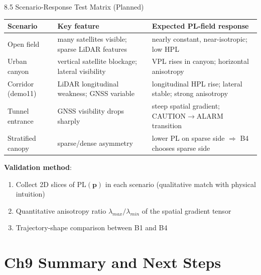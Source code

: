 \documentclass[10pt,aspectratio=169,xcolor=dvipsnames]{beamer}
\newcommand{\PL}{\mathrm{PL}}
\newcommand{\1}{\mathbb{1}}
\begin{document}
\begin{frame}{8.5 Scenario-Response Test Matrix (Planned)}
  \footnotesize
  \begin{table}
    \begin{tabular}{p{} p{} p{}}
      \toprule
      \textbf{Scenario} & \textbf{Key feature} & \textbf{Expected PL-field response}\\
      \midrule
      Open field & many satellites visible; sparse LiDAR features & nearly constant, near-isotropic; low HPL\\
      Urban canyon & vertical satellite blockage; lateral visibility & VPL rises in canyon; horizontal anisotropy\\
      Corridor (demo11) & LiDAR longitudinal weakness; GNSS variable & longitudinal HPL rise; lateral stable; strong anisotropy\\
      Tunnel entrance & GNSS visibility drops sharply & steep spatial gradient; CAUTION$\to$ALARM transition\\
      Stratified canopy & sparse/dense asymmetry & lower PL on sparse side $\Rightarrow$ B4 chooses sparse side\\
      \bottomrule
    \end{tabular}
  \end{table}

  \medskip
  \textbf{Validation method}:
  \begin{enumerate}\scriptsize
    \item Collect 2D slices of $\PL(\bm{p})$ in each scenario (qualitative match with physical intuition)
    \item Quantitative anisotropy ratio $\lambda_{max}/\lambda_{min}$ of the spatial gradient tensor
    \item Trajectory-shape comparison between B1 and B4
  \end{enumerate}
\end{frame}

\section{Ch9 Summary and Next Steps}
\end{document}

